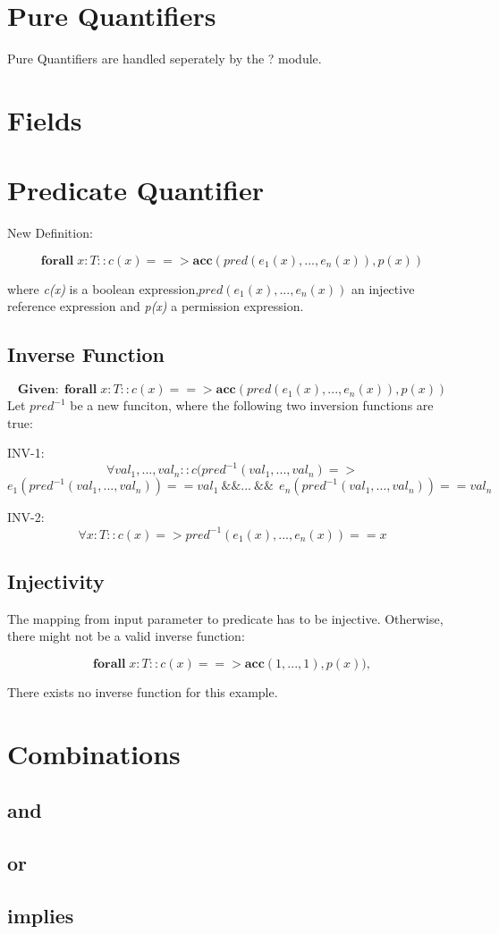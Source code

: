 \documentclass[12pt]{article}
\begin{document}
\maketitle
\section{Pure Quantifiers}
Pure Quantifiers are handled seperately by the ? module.
\section{Fields}
\section{Predicate Quantifier}
New Definition:

\begin{equation}
	\mathbf{forall} \; x:T :: c(x) ==>\mathbf{acc}( pred(e_1(x), ... ,e_n(x)), p(x) )
\end{equation}

where {\it c(x)} is  a boolean expression,$pred(e_1(x), ... ,e_n(x))$ an injective reference expression and {\it p(x)} a permission expression.

\subsection{Inverse Function}

\[ \mathbf{Given: \; } \mathbf{forall} \; x:T :: c(x) ==> \mathbf{acc}( pred(e_1(x), ... ,e_n(x)), p(x) )   \]
Let  $pred^{- 1}$ be a new funciton, where the following two inversion functions are true:

INV-1:
\[ \forall val_1, ..., val_n :: c(pred^{-1} (val_1, ..., val_n) => \]
\[ e_1 (pred^{-1} (val_1, ..., val_n)) == val_1 \: \&\&  ... \: \&\&  \:\: e_n(pred^{-1} (val_1, ..., val_n)) == val_n\]


INV-2:
\[ \forall x:T :: c(x) => pred^{-1}(e_1(x), ..., e_n(x)) == x\]

\subsection{Injectivity}
The mapping from input parameter to predicate has to be injective. Otherwise, there might not be a valid inverse function:


\begin{equation}
	\mathbf{forall} \; x:T :: c(x) ==> \mathbf{acc}( 1, ... ,1), p(x) ) ,
\end{equation}

There exists no inverse function for this example.

\section{Combinations}

\subsection{and}

\subsection{or}

\subsection{implies}
\end{document}
